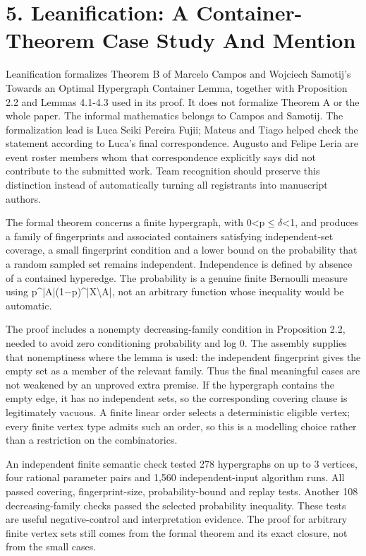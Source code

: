 \documentclass[11pt,a4paper]{article}
\begin{document}
\section{5. Leanification: A Container-Theorem Case Study And Mention}
Leanification formalizes Theorem B of Marcelo Campos and Wojciech Samotij's Towards an Optimal Hypergraph Container Lemma, together with Proposition 2.2 and Lemmas 4.1-4.3 used in its proof. It does not formalize Theorem A or the whole paper. The informal mathematics belongs to Campos and Samotij. The formalization lead is Luca Seiki Pereira Fujii; Mateus and Tiago helped check the statement according to Luca's final correspondence. Augusto and Felipe Leria are event roster members whom that correspondence explicitly says did not contribute to the submitted work. Team recognition should preserve this distinction instead of automatically turning all registrants into manuscript authors.

The formal theorem concerns a finite hypergraph, with 0<p\ensuremath{\leq}\ensuremath{\delta}<1, and produces a family of fingerprints and associated containers satisfying independent-set coverage, a small fingerprint condition and a lower bound on the probability that a random sampled set remains independent. Independence is defined by absence of a contained hyperedge. The probability is a genuine finite Bernoulli measure using p\textasciicircum{}|A|(1\ensuremath{-}p)\textasciicircum{}|X\textbackslash{}A|, not an arbitrary function whose inequality would be automatic.

The proof includes a nonempty decreasing-family condition in Proposition 2.2, needed to avoid zero conditioning probability and log 0. The assembly supplies that nonemptiness where the lemma is used: the independent fingerprint gives the empty set as a member of the relevant family. Thus the final meaningful cases are not weakened by an unproved extra premise. If the hypergraph contains the empty edge, it has no independent sets, so the corresponding covering clause is legitimately vacuous. A finite linear order selects a deterministic eligible vertex; every finite vertex type admits such an order, so this is a modelling choice rather than a restriction on the combinatorics.

An independent finite semantic check tested 278 hypergraphs on up to 3 vertices, four rational parameter pairs and 1,560 independent-input algorithm runs. All passed covering, fingerprint-size, probability-bound and replay tests. Another 108 decreasing-family checks passed the selected probability inequality. These tests are useful negative-control and interpretation evidence. The proof for arbitrary finite vertex sets still comes from the formal theorem and its exact closure, not from the small cases.
\end{document}
